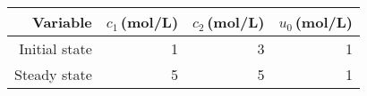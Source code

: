 \begin{tabular}{rrrr}
    \hline
    \hline
    Variable & $c_1$\,(mol/L) & $c_2$\,(mol/L) & $u_0$\,(mol/L)\\
    \hline
    Initial state & 1 & 3 & 1\\
    Steady state & 5 & 5 & 1\\
    \hline
\end{tabular}
